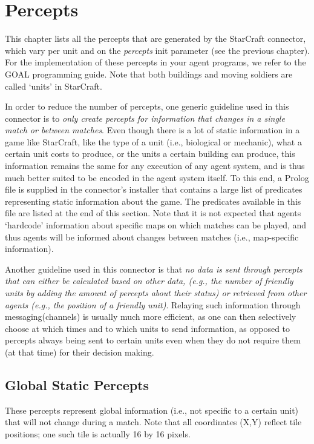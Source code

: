 \chapter{Percepts}

This chapter lists all the percepts that are generated by the StarCraft connector, which vary per unit and on the \textit{percepts} init parameter (see the previous chapter). For the implementation of these percepts in your agent programs, we refer to the GOAL programming guide. Note that both buildings and moving soldiers are called `units' in StarCraft.

In order to reduce the number of percepts, one generic guideline used in this connector is to \textit{only create percepts for information that changes in a single match or between matches}. Even though there is a lot of static information in a game like StarCraft, like the type of a unit (i.e., biological or mechanic), what a certain unit costs to produce, or the units a certain building can produce, this information remains the same for any execution of any agent system, and is thus much better suited to be encoded in the agent system itself. To this end, a Prolog file is supplied in the connector's installer that contains a large list of predicates representing static information about the game. The predicates available in this file are listed at the end of this section. Note that it is not expected that agents `hardcode' information about specific maps on which matches can be played, and thus agents will be informed about changes between matches (i.e., map-specific information).

Another guideline used in this connector is that \textit{no data is sent through percepts that can either be calculated based on other data, (e.g., the number of friendly units by adding the amount of percepts about their status) or retrieved from other agents (e.g., the position of a friendly unit)}. Relaying such information through messaging(channels) is usually much more efficient, as one can then selectively choose at which times and to which units to send information, as opposed to percepts always being sent to certain units even when they do not require them (at that time) for their decision making.

\pagebreak

\section{Global Static Percepts}
These percepts represent global information (i.e., not specific to a certain unit) that will not change during a match. Note that all coordinates (X,Y) reflect tile positions; one such tile is actually 16 by 16 pixels.

